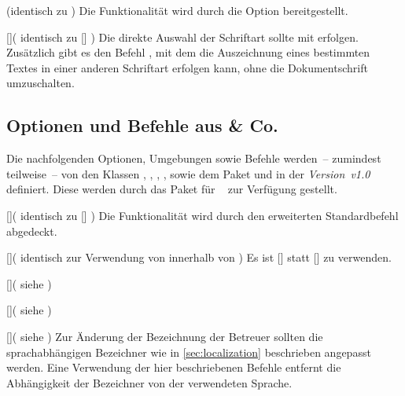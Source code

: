 \begin{Bundle*}{}
\begin{Declaration}{}(identisch zu )
\printdeclarationlist%
%
Die Funktionalität wird durch die Option  bereitgestellt.
\end{Declaration}

\begin{Declaration}{[]}(%
  identisch zu []%
)
\printdeclarationlist%
%
Die direkte Auswahl der Schriftart sollte mit  erfolgen. 
Zusätzlich gibt es den Befehl , mit dem die Auszeichnung 
eines bestimmten Textes in einer anderen Schriftart erfolgen kann, ohne die 
Dokumentschrift umzuschalten.
\end{Declaration}
%


\subsection{Optionen und Befehle aus  \& Co.}
%
Die nachfolgenden Optionen, Umgebungen sowie Befehle werden~-- zumindest 
teilweise~-- von den Klassen , , 
, ,  sowie dem Paket 
 und \TUDScript in der \emph{Version~v1.0} definiert. Diese 
werden durch das Paket  für \TUDScript~\vTUDScript{} zur 
Verfügung gestellt.

\begin{Declaration}{[]}(%
  identisch zu []%
)
\printdeclarationlist%
%
Die Funktionalität wird durch den erweiterten Standardbefehl  
abgedeckt.
\end{Declaration}

\begin{Declaration}{[]}(%
  identisch zur Verwendung von  innerhalb von %
)
\printdeclarationlist%
%
Es ist []
statt [] zu verwenden.
\end{Declaration}

\begin{Declaration}{[]}(%
  siehe %
)
\begin{Declaration}{[]}(%
  siehe %
)
\begin{Declaration}{[]}(%
  siehe %
)
\printdeclarationlist%
%
Zur Änderung der Bezeichnung der Betreuer sollten die sprachabhängigen 
Bezeichner wie in \autoref{sec:localization} beschrieben angepasst werden. Eine 
Verwendung der hier beschriebenen Befehle entfernt die Abhängigkeit der 
Bezeichner von der verwendeten Sprache.
\end{Declaration}
\end{Declaration}
\end{Declaration}


\end{Bundle*}

